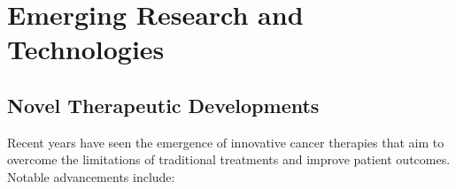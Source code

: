 
\section{Emerging Research and Technologies}


\subsection{Novel Therapeutic Developments}

Recent years have seen the emergence of innovative cancer therapies that aim to overcome the 
limitations of traditional treatments and improve patient outcomes. Notable advancements include:

